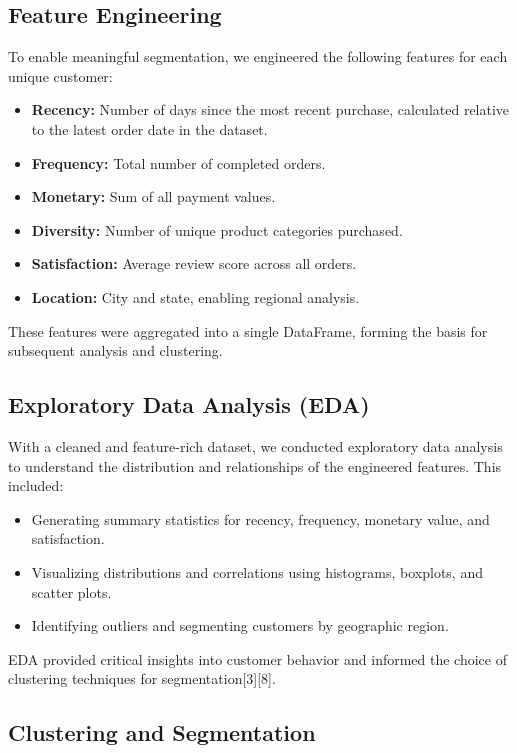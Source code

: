 \documentclass[a4paper]{article}
\begin{document}
\begin{multicols}{2}
\subsection{Feature Engineering}

To enable meaningful segmentation, we engineered the following features for each unique customer:
\begin{itemize}
    \item \textbf{Recency:} Number of days since the most recent purchase, calculated relative to the latest order date in the dataset.
    \item \textbf{Frequency:} Total number of completed orders.
    \item \textbf{Monetary:} Sum of all payment values.
    \item \textbf{Diversity:} Number of unique product categories purchased.
    \item \textbf{Satisfaction:} Average review score across all orders.
    \item \textbf{Location:} City and state, enabling regional analysis.
\end{itemize}
These features were aggregated into a single DataFrame, forming the basis for subsequent analysis and clustering.

\subsection{Exploratory Data Analysis (EDA)}

With a cleaned and feature-rich dataset, we conducted exploratory data analysis to understand the distribution and relationships of the engineered features. This included:
\begin{itemize}
    \item Generating summary statistics for recency, frequency, monetary value, and satisfaction.
    \item Visualizing distributions and correlations using histograms, boxplots, and scatter plots.
    \item Identifying outliers and segmenting customers by geographic region.
\end{itemize}
EDA provided critical insights into customer behavior and informed the choice of clustering techniques for segmentation[3][8].

\subsection{Clustering and Segmentation}


\end{multicols}
\end{document}
